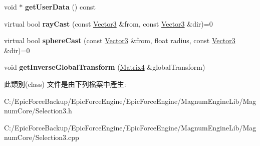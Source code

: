 \begin{DoxyCompactItemize}
\item 
void $\ast$ {\bfseries get\+User\+Data} () const \hypertarget{class_magnum_1_1_selection3_1_1_bound_afe4bfda8ac45ced59f1bffa36ec43147}{}\label{class_magnum_1_1_selection3_1_1_bound_afe4bfda8ac45ced59f1bffa36ec43147}

\item 
virtual bool {\bfseries ray\+Cast} (const \hyperlink{class_magnum_1_1_vector3}{Vector3} \&from, const \hyperlink{class_magnum_1_1_vector3}{Vector3} \&dir)=0\hypertarget{class_magnum_1_1_selection3_1_1_bound_ab04b35491e983dcf172237bf37de0e81}{}\label{class_magnum_1_1_selection3_1_1_bound_ab04b35491e983dcf172237bf37de0e81}

\item 
virtual bool {\bfseries sphere\+Cast} (const \hyperlink{class_magnum_1_1_vector3}{Vector3} \&from, float radius, const \hyperlink{class_magnum_1_1_vector3}{Vector3} \&dir)=0\hypertarget{class_magnum_1_1_selection3_1_1_bound_aab6d454be393ac8c7b14ab1bc424aeb2}{}\label{class_magnum_1_1_selection3_1_1_bound_aab6d454be393ac8c7b14ab1bc424aeb2}

\item 
void {\bfseries get\+Inverse\+Global\+Transform} (\hyperlink{class_magnum_1_1_matrix4}{Matrix4} \&global\+Transform)\hypertarget{class_magnum_1_1_selection3_1_1_bound_ad08bf1c98a8ba6ddf713b1fd87df3f1a}{}\label{class_magnum_1_1_selection3_1_1_bound_ad08bf1c98a8ba6ddf713b1fd87df3f1a}

\end{DoxyCompactItemize}


此類別(class) 文件是由下列檔案中產生\+:\begin{DoxyCompactItemize}
\item 
C\+:/\+Epic\+Force\+Backup/\+Epic\+Force\+Engine/\+Epic\+Force\+Engine/\+Magnum\+Engine\+Lib/\+Magnum\+Core/Selection3.\+h\item 
C\+:/\+Epic\+Force\+Backup/\+Epic\+Force\+Engine/\+Epic\+Force\+Engine/\+Magnum\+Engine\+Lib/\+Magnum\+Core/Selection3.\+cpp\end{DoxyCompactItemize}
